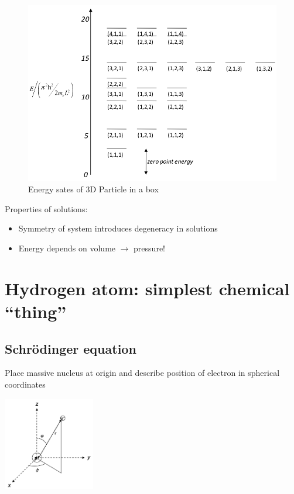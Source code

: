 \documentclass[11pt]{article}
\begin{document}
\begin{figure}[htbp]
\centering
\includegraphics[width=.9\linewidth]{./Images/3DEnergyStates.png}
\caption{Energy sates of 3D Particle in a box}
\end{figure}

Properties of solutions:
\begin{itemize}
\item Symmetry of system introduces degeneracy in solutions
\item Energy depends on volume \(\rightarrow\) pressure!
\end{itemize}

\newpage

\section{Hydrogen atom: simplest chemical ``thing''}
\label{sec:org740a5c8}
\subsection{Schr\"{o}dinger equation}
\label{sec:org8f982d4}
Place massive nucleus at origin and describe position of electron in spherical coordinates

\begin{center}
\includegraphics[width=0.3\textwidth]{./Images/spherical.png}
\end{center}
\end{document}
